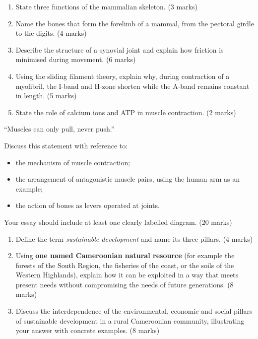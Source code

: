 \documentclass[11pt]{article}
\begin{document}
\begin{exercice}
\begin{enumerate}
\item State three functions of the mammalian skeleton. \hfill (3 marks)
\item Name the bones that form the forelimb of a mammal, from the pectoral girdle to the digits. \hfill (4 marks)
\item Describe the structure of a synovial joint and explain how friction is minimised during movement. \hfill (6 marks)
\item Using the sliding filament theory, explain why, during contraction of a myofibril, the I-band and H-zone shorten while the A-band remains constant in length. \hfill (5 marks)
\item State the role of calcium ions and ATP in muscle contraction. \hfill (2 marks)
\end{enumerate}
\end{exercice}

\begin{exercice}
``Muscles can only pull, never push.''

Discuss this statement with reference to:
\begin{itemize}
\item the mechanism of muscle contraction;
\item the arrangement of antagonistic muscle pairs, using the human arm as an example;
\item the action of bones as levers operated at joints.
\end{itemize}
Your essay should include at least one clearly labelled diagram. \hfill (20 marks)
\end{exercice}

\begin{exercice}
\begin{enumerate}
\item Define the term \emph{sustainable development} and name its three pillars. \hfill (4 marks)
\item Using \textbf{one named Cameroonian natural resource} (for example the forests of the South Region, the fisheries of the coast, or the soils of the Western Highlands), explain how it can be exploited in a way that meets present needs without compromising the needs of future generations. \hfill (8 marks)
\item Discuss the interdependence of the environmental, economic and social pillars of sustainable development in a rural Cameroonian community, illustrating your answer with concrete examples. \hfill (8 marks)
\end{enumerate}
\end{exercice}
\end{document}
